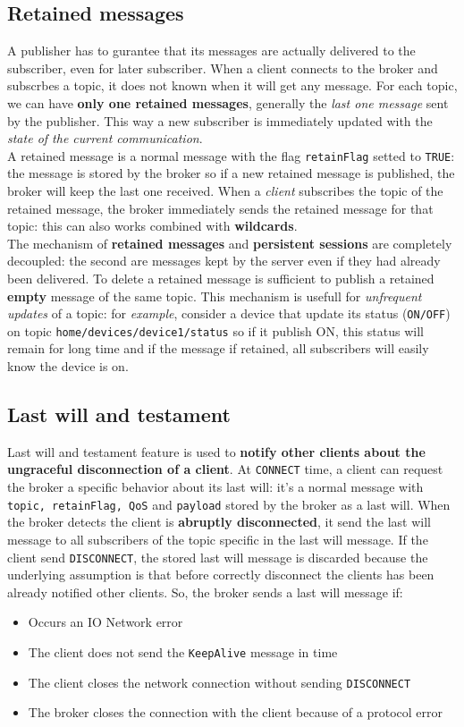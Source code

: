 \documentclass[10pt,a4paper]{report}
\theoremstyle{definition}
\begin{document}
\subsection{Retained messages}\label{sec:retained-messages}
A publisher has to gurantee that its messages are actually delivered to the subscriber, even for later subscriber. When a client connects to the broker and subscrbes a topic, it does not known when it will get any message. For each topic, we can have \textbf{only one retained messages}, generally the \textit{last one message} sent by the publisher. This way a new subscriber is immediately updated with the \textit{state of the current communication}.\\
A retained message is a normal message with the flag \texttt{retainFlag} setted to \texttt{TRUE}: the message is stored by the broker so if a new retained message is published, the broker will keep the last one received.
When a \textit{client} subscribes the topic of the retained message, the broker immediately sends the retained message for that topic: this can also works combined with \textbf{wildcards}.\\
The mechanism of \textbf{retained messages} and \textbf{persistent sessions} are completely decoupled: the second are messages kept by the server even if they had already been delivered. To delete a retained message is sufficient to publish a retained \textbf{empty} message of the same topic. This mechanism is usefull for \textit{unfrequent updates} of a topic: for \textit{example}, consider a device that update its status (\texttt{ON/OFF}) on topic \texttt{home/devices/device1/status} so if it publish ON, this status will remain for long time and if the message if retained, all subscribers will easily know the device is on.
\subsection{Last will and testament}\label{sec:last-will-and-testament}
Last will and testament feature is used to \textbf{notify other clients about the ungraceful disconnection of a client}. At \texttt{CONNECT} time, a client can request the broker a specific behavior about its last will: it's a normal message with \texttt{topic, retainFlag, QoS} and \texttt{payload} stored by the broker as a last will.
When the broker detects the client is \textbf{abruptly disconnected}, it send the last will message to all subscribers of the topic specific in the last will message. If the client send \texttt{DISCONNECT}, the stored last will message is discarded because the underlying assumption is that before correctly disconnect the clients has been already notified other clients.
So, the broker sends a last will message if:
\begin{itemize}
	\item 
	Occurs an IO Network error
	\item 
	The client does not send the \texttt{KeepAlive} message in time
	\item 
	The client closes the network connection without sending \texttt{DISCONNECT}
	\item 
	The broker closes the connection with the client because of a protocol error
\end{itemize}
\end{document}
